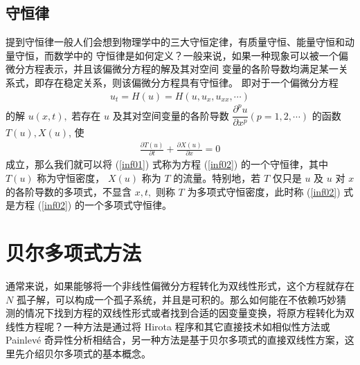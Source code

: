 \subsection{守恒律}
提到守恒律一般人们会想到物理学中的三大守恒定律，有质量守恒、能量守恒和动量守恒，而数学中的
守恒律是如何定义？一般来说，如果一种现象可以被一个偏微分方程表示，并且该偏微分方程的解及其对空间
变量的各阶导数均满足某一关系式，即存在稳定关系，则该偏微分方程具有守恒律。 即对于一个偏微分方程
\begin{align}
u_t=H(u)=H(u,u_x,u_{xx},\cdots)\label{inf02}
\end{align}
的解 $u(x,t),$ 若存在 $u$ 及其对空间变量的各阶导数 $\dfrac{\partial^pu}{\partial x^p}(p=1,2,\cdots)$ 的函数 $T(u), X(u)$, 使
\begin{align}
\frac{\partial T(u)}{\partial t}+\frac{\partial X(u)}{\partial x}=0\label{inf01}
\end{align}
成立，那么我们就可以将 (\ref{inf01}) 式称为方程 (\ref{inf02}) 的一个守恒律，其中 $T(u)$ 称为守恒密度， $X(u)$ 称为 $T$ 的流量。特别地，若 $T$ 仅只是 $u$ 及 $u$ 对 $x$ 的各阶导数的多项式，不显含 $x, t,$ 则称 $T$ 为多项式守恒密度，此时称 (\ref{inf02}) 式是方程 (\ref{inf02}) 的一个多项式守恒律。

\section{贝尔多项式方法}
通常来说，如果能够将一个非线性偏微分方程转化为双线性形式，这个方程就存在 $N$ 孤子解，可以构成一个孤子系统，并且是可积的。那么如何能在不依赖巧妙猜测的情况下找到方程的双线性形式或者找到合适的因变量变换，将原方程转化为双线性方程呢？一种方法是通过将 Hirota 程序和其它直接技术如相似性方法或 Painlev\'{e} 奇异性分析相结合，另一种方法是基于贝尔多项式的直接双线性方案，这里先介绍贝尔多项式的基本概念。

